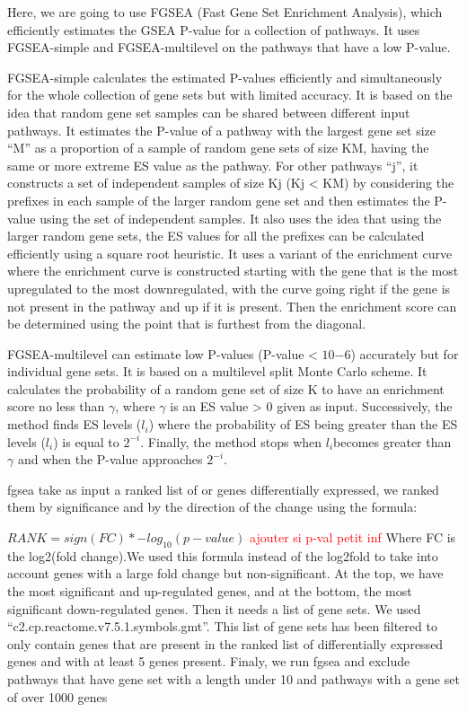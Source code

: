 \documentclass[a4paper, 11pt]{article}
\begin{document}
\begin{multicols}{2}
Here, we are going to use FGSEA (Fast Gene Set Enrichment Analysis), which efficiently estimates the GSEA P-value for a collection of pathways. It uses FGSEA-simple and FGSEA-multilevel on the pathways that have a low P-value.

FGSEA-simple calculates the estimated P-values efficiently and simultaneously for the whole collection of gene sets but with limited accuracy. It is based on the idea that random gene set samples can be shared between different input pathways. It estimates the P-value of a pathway with the largest gene set size “M” as a proportion of a sample of random gene sets of size KM, having the same or more extreme ES value as the pathway. For other pathways “j”, it constructs a set of independent samples of size Kj (Kj < KM) by considering the prefixes in each sample of the larger random gene set and then estimates the P-value using the set of independent samples. It also uses the idea that using the larger random gene sets, the ES values for all the prefixes can be calculated efficiently using a square root heuristic. It uses a variant of the enrichment curve where the enrichment curve is constructed starting with the gene that is the most upregulated to the most downregulated, with the curve going right if the gene is not present in the pathway and up if it is present. Then the enrichment score can be determined using the point that is furthest from the diagonal.

FGSEA-multilevel can estimate low P-values (P-value < $10{-6}$) accurately but for individual gene sets. It is based on a multilevel split Monte Carlo scheme. It calculates the probability of a random gene set of size K to have an enrichment score no less than $\gamma$, where $\gamma$ is an ES value > 0 given as input. Successively, the method finds ES levels ($l_i$) where the probability of ES being greater than the ES levels ($l_i$) is equal to $2^{-i}$. Finally, the method stops when $ l_i $becomes greater than $\gamma$ and when the P-value approaches $2^{-i}$.

fgsea take as input a ranked list of or genes differentially expressed, we ranked them by significance and by the direction of the change using the formula:

 $ RANK =sign(FC)* -log_{10}(p-value)  $
\textcolor{red} { ajouter si p-val petit inf  }
 Where FC is the log2(fold change).We used this formula instead of the log2fold to take into account genes with a large fold change but non-significant. At the top, we have the most significant and up-regulated genes, and at the bottom, the most significant down-regulated genes. Then it needs a list of gene sets. We used “c2.cp.reactome.v7.5.1.symbols.gmt”. This list of gene sets has been filtered to only contain genes  that are present in the ranked list of differentially expressed genes and with at least 5 genes present. Finaly, we run fgsea and exclude pathways that have gene set with a length under 10 and pathways with a gene set of over 1000 genes 







\end{multicols}
\end{document}
